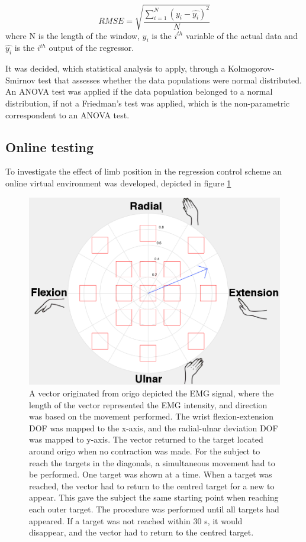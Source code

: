 \begin{equation} \label{eq:rmse}
RMSE = \sqrt{\frac{\sum\limits_{i=1}^N(y_i - \hat{y_i})^2}{N}}
\end{equation}
where N is the length of the window, $y_i$ is the $i^{th}$ variable of the actual data and $\hat{y_i}$ is the $i^{th}$ output of the regressor.

It was decided, which statistical analysis to apply, through a Kolmogorov-Smirnov test that assesses whether the data populations were normal distributed. An ANOVA test was applied if the data population belonged to a normal distribution, if not a Friedman's test was applied, which is the non-parametric correspondent to an ANOVA test.

\subsection{Online testing}
To investigate the effect of limb position in the regression control scheme an online virtual environment was developed, depicted in figure \ref{fig:targets}

	\begin{figure}[thpb]
		\centering
		\includegraphics[scale=0.25]{Figures/Target}
		\caption{A vector originated from origo depicted the EMG signal, where the length of the vector represented the EMG intensity, and direction was based on the movement performed. The wrist flexion-extension DOF was mapped to the x-axis, and the radial-ulnar deviation DOF was mapped to y-axis. The vector returned to the target located around origo when no contraction was made. For the subject to reach the targets in the diagonals, a simultaneous movement had to be performed. One target was shown at a time. When a target was reached, the vector had to return to the centred target for a new to appear. This gave the subject the same starting point when reaching each outer target. The procedure was performed until all targets had appeared. If a target was not reached within 30 s, it would disappear, and the vector had to return to the centred target.}
		\label{fig:targets}
	\end{figure}

